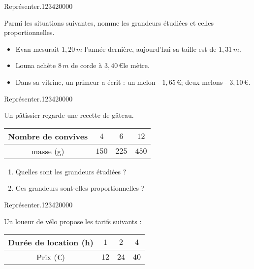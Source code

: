 \begin{pageAD} 

 

\begin{ExoCad}{Représenter.}{1234}{2}{0}{0}{0}{0}
 
Parmi les situations suivantes, nomme les grandeurs étudiées et celles proportionnelles.
\begin{itemize}[leftmargin=*]
 \item Evan mesurait $1,20\,m$ l'année dernière, aujourd'hui sa taille est de $1,31\,m$. 
 \item Louna achète $8\,m$ de corde à $3,40\,$\euro le mètre. 
 \item Dans sa vitrine, un primeur a écrit : un melon - $1,65\,$\euro ; deux melons - $3,10\,$\euro. 
\end{itemize}
 


\end{ExoCad}

\begin{ExoCad}{Représenter.}{1234}{2}{0}{0}{0}{0}

Un pâtissier regarde une recette de gâteau.
\begin{center}
    \begin{tabular}{|c|c|c|c|}        
    	\hline 
        Nombre de convives & $4$ & $6$ & $12$ \\ 
    	\hline 
         masse (g) & $150$ & $225$ & $450$ \\\hline 
    \end{tabular}
\end{center}

\begin{enumerate}[leftmargin=*]
\item Quelles sont les grandeurs étudiées ? 
\item Ces grandeurs sont-elles proportionnelles ? 
\end{enumerate}
 
\end{ExoCad}

\begin{ExoCad}{Représenter.}{1234}{2}{0}{0}{0}{0}

Un loueur de vélo propose les tarifs suivants :


\begin{center}
    \begin{tabular}{|c|c|c|c|}\hline 
        Durée de location (h) & $1$ & $2$ & $4$ \\
        \hline Prix (\euro) & $12$ & $24$ & $40$ \\\hline  
    \end{tabular}
\end{center}


\end{ExoCad}
\end{pageAD}

